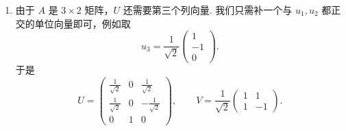 \begin{solution}
\begin{enumerate}
              对于 $ v_2 $，
              \[
                  Av_2
                  =
                  \frac{1}{\sqrt{2}}
                  \begin{pmatrix}
                      1 & 1  \\
                      1 & 1  \\
                      1 & -1
                  \end{pmatrix}
                  \begin{pmatrix}
                      1  \\
                      -1
                  \end{pmatrix}
                  =
                  \frac{1}{\sqrt{2}}
                  \begin{pmatrix}
                      0 \\
                      0 \\
                      2
                  \end{pmatrix}
                  =
                  \begin{pmatrix}
                      0      \\
                      0      \\
                      \sqrt{2}
                  \end{pmatrix},
              \]
              故
              \[
                  u_2 = \frac{1}{\sqrt{2}}Av_2
                  =
                  \begin{pmatrix}
                      0 \\
                      0 \\
                      1
                  \end{pmatrix}.
              \]

        \item 由于 $ A $ 是 $ 3 \times 2 $ 矩阵，$ U $ 还需要第三个列向量. 我们只需补一个与 $ u_1, u_2 $ 都正交的单位向量即可，例如取
              \[
                  u_3 = \frac{1}{\sqrt{2}}
                  \begin{pmatrix}
                      1  \\
                      -1 \\
                      0
                  \end{pmatrix}.
              \]
              于是
              \[
                  U =
                  \begin{pmatrix}
                      \frac{1}{\sqrt{2}} & 0 & \frac{1}{\sqrt{2}}  \\
                      \frac{1}{\sqrt{2}} & 0 & -\frac{1}{\sqrt{2}} \\
                      0                  & 1 & 0
                  \end{pmatrix},\qquad
                  V =
                  \frac{1}{\sqrt{2}}
                  \begin{pmatrix}
                      1 & 1  \\
                      1 & -1
                  \end{pmatrix}.
              \]


\end{enumerate}
\end{solution}
